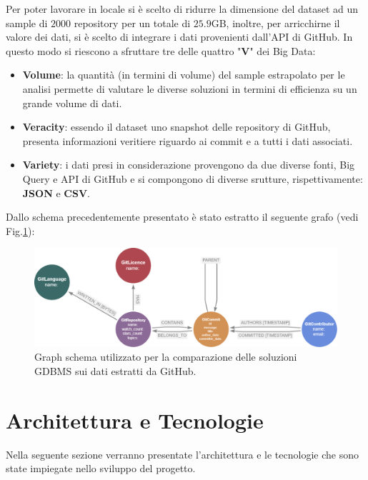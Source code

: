 \documentclass[11pt]{article}
\begin{document}
 Per poter lavorare in locale si è scelto di ridurre la dimensione del dataset ad un sample di $2000$ repository per un totale di $25.9$GB, inoltre, per arricchirne il valore dei dati, si è scelto di integrare i dati provenienti dall'API di GitHub.
In questo modo si riescono a sfruttare tre delle quattro "\textbf{V}" dei Big Data:
\begin{itemize}
    \item \textbf{Volume}: la quantità (in termini di volume) del sample estrapolato per le analisi permette di valutare le diverse soluzioni in termini di efficienza su un grande volume di dati.
    
    \item \textbf{Veracity}: essendo il dataset uno snapshot delle repository di GitHub, presenta informazioni veritiere riguardo ai commit e a tutti i dati associati. 

    \item \textbf{Variety}: i dati presi in considerazione provengono da due diverse fonti, Big Query e API di GitHub e si compongono di diverse srutture, rispettivamente: \textbf{JSON} e \textbf{CSV}.
\end{itemize}
Dallo schema precedentemente presentato è stato estratto il seguente grafo (vedi Fig.\ref{image:graph_schema}):
\begin{figure}[!ht]
    \centering
    \includegraphics[width=\textwidth]{./images/graph_schema.png}
    \caption{Graph schema utilizzato per la comparazione delle soluzioni GDBMS sui dati estratti da GitHub.}
    \label{image:graph_schema}
\end{figure}

\newpage
\section{Architettura e Tecnologie}
Nella seguente sezione verranno presentate l'architettura e le tecnologie che sono state impiegate nello sviluppo del progetto.
\end{document}
